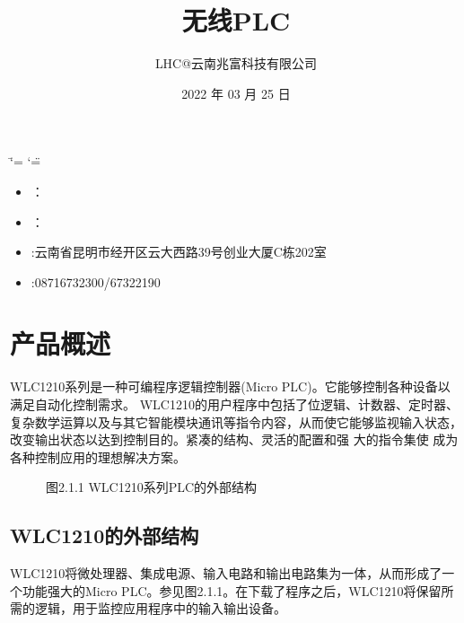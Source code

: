 \documentclass[a4paper,10pt,english]{sphinxmanual}
\title{无线PLC}
\date{2022 年 03 月 25 日}
\author{LHC@云南兆富科技有限公司}
\begin{document}
\ifdefined\shorthandoff
  \ifnum\catcode`\=\string=\active\shorthandoff{=}\fi
  \ifnum\catcode`\"=\active{}\fi
\fi

\pagestyle{empty}
\sphinxmaketitle
\pagestyle{plain}
\sphinxtableofcontents
\pagestyle{normal}
\label{\detokenize{index::doc}}


\begin{figure}[htbp]
\centering

\noindent{}
\end{figure}
\begin{itemize}
\item {} 
\sphinxAtStartPar
{}：

\item {} 
\sphinxAtStartPar
{}：

\item {} 
\sphinxAtStartPar
{}:云南省昆明市经开区云大西路39号创业大厦C栋202室

\item {} 
\sphinxAtStartPar
{}:0871\sphinxhyphen{}6732300/67322190

\end{itemize}


\chapter{产品概述}
\label{\detokenize{Product_Overview:id1}}\label{\detokenize{Product_Overview::doc}}
\sphinxAtStartPar
WLC\sphinxhyphen{}1210系列是一种可编程序逻辑控制器(Micro PLC)。它能够控制各种设备以满足自动化控制需求。
WLC\sphinxhyphen{}1210的用户程序中包括了位逻辑、计数器、定时器、复杂数学运算以及与其它智能模块通讯等指令内容，从而使它能够监视输入状态，改变输出状态以达到控制目的。紧凑的结构、灵活的配置和强 大的指令集使  成为各种控制应用的理想解决方案。

\begin{figure}[htbp]
\centering
\capstart

\noindent{}
\caption{图2.1.1  WLC\sphinxhyphen{}1210系列PLC的外部结构}\label{\detokenize{Product_Overview:id4}}\end{figure}


\section{WLC\sphinxhyphen{}1210的外部结构}
\label{\detokenize{Product_Overview:wlc-1210}}
\sphinxAtStartPar
WLC\sphinxhyphen{}1210将微处理器、集成电源、输入电路和输出电路集为一体，从而形成了一个功能强大的Micro PLC。参见图2.1.1。在下载了程序之后，WLC\sphinxhyphen{}1210将保留所需的逻辑，用于监控应用程序中的输入输出设备。
\end{document}
